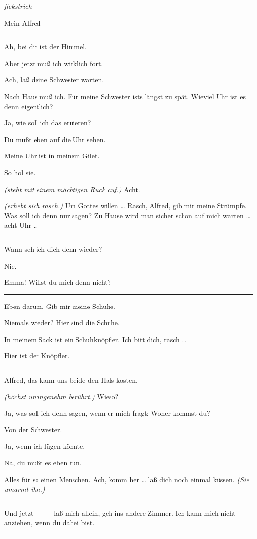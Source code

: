 \documentclass[
	final,
	a4paper,
	ngerman,
	mpinclude = true, %
	twoside = true,
	open = right,
	cleardoublepage = plain,
	DIV = 13,
	BCOR = 1cm,
	titlepage = firstiscover,
	]{scrbook}
\newcommand{\direction}[1]{\textit{(#1)}}
\newcommand{\hiat}{%
	\begin{center}
		\tiny
		\raisebox{0.5ex}{\rule{0.3\linewidth}{0.4pt}}
		\textit{fickstrich}
		\raisebox{0.5ex}{\rule{0.3\linewidth}{0.4pt}}
	\end{center}
}
\newenvironment{deletion}{%
		\vspace{0.25\baselineskip}
		\hrule
		\vspace{0.25\baselineskip}
		\color{darkgray}
	}{
		\color{black}
		\vspace{0.25\baselineskip}
		\hrule 
		\vspace{0.25\baselineskip}
	}
\newcommand{\thecharacter}[1]{\textup{\textsc{#1}}\xspace}
\newcommand{\theherr}{\thecharacter{Junger Herr}}
\newcommand{\thefrau}{\thecharacter{Junge Frau}}
\newcommand{\character}[1]{\item[#1:]}
\newcommand{\herr}{\character{\theherr}}
\newcommand{\frau}{\character{\thefrau}}
\begin{document}
\begin{play}
	\hiat

	\frau
	Mein Alfred ---

	\begin{deletion}
	\herr
	Ah, bei dir ist der Himmel.

	\frau
	Aber jetzt muß ich wirklich fort.

	\herr
	Ach, laß deine Schwester warten.

	\frau
	Nach Haus muß ich. Für meine Schwester ists längst zu spät. Wieviel Uhr ist es denn eigentlich?

	\herr
	Ja, wie soll ich das eruieren?

	\frau
	Du mußt eben auf die Uhr sehen.

	\herr
	Meine Uhr ist in meinem Gilet.

	\frau
	So hol sie.

	\herr
	\direction{steht mit einem mächtigen Ruck auf.} Acht.

	\frau
	\direction{erhebt sich rasch.} Um Gottes willen \ldots{} Rasch, Alfred, gib mir meine Strümpfe. Was soll ich denn nur sagen? Zu Hause wird man sicher schon auf mich warten \ldots{} acht Uhr \ldots{}
	\end{deletion}

	\herr
	Wann seh ich dich denn wieder?

	\frau
	Nie.

	\herr
	Emma! Willst du  mich denn nicht?

	\begin{deletion}
	\frau
	Eben darum. Gib mir meine Schuhe.

	\herr
	Niemals wieder? Hier sind die Schuhe.

	\frau
	In meinem Sack ist ein Schuhknöpfler. Ich bitt dich, rasch \ldots{}

	\herr
	Hier ist der Knöpfler.
	\end{deletion}

	\frau
	Alfred, das kann uns beide den Hals kosten.

	\herr
	\direction{höchst unangenehm berührt.} Wieso?

	\frau
	Ja, was soll ich denn sagen, wenn er mich fragt: Woher kommst du?

	\herr
	Von der Schwester.

	\frau
	Ja, wenn ich lügen könnte.

	\herr
	Na, du mußt es eben tun.

	\frau
	Alles für so einen Menschen. Ach, komm her \ldots{} laß dich noch einmal küssen. \direction{Sie umarmt ihn.} ---
	\begin{deletion}
	Und jetzt --- --- laß mich allein, geh ins andere Zimmer. Ich kann mich nicht anziehen, wenn du dabei bist.


\end{deletion}
\end{play}
\end{document}
